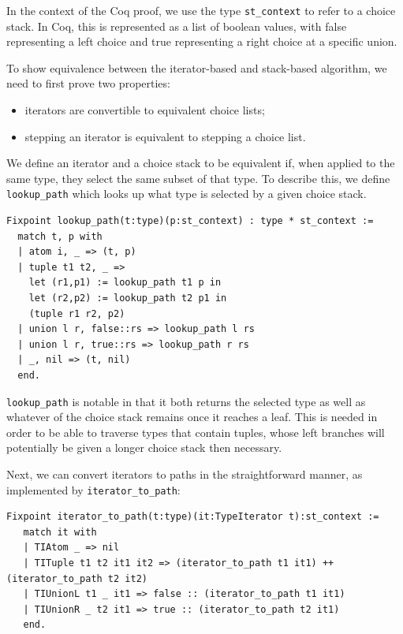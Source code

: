 \documentclass[a4paper,english]{lipics-v2019}
\begin{document}
In the context of the Coq proof, we use the type \verb|st_context| to refer
to a choice stack. In Coq, this is represented as a list of boolean values,
with false representing a left choice and true representing a right choice at
a specific union.

To show equivalence between the iterator-based and stack-based algorithm, we need to
first prove two properties:

\begin{itemize}
  \item iterators are convertible to equivalent choice lists;
  \item stepping an iterator is equivalent to stepping a choice list.
\end{itemize}

We define an iterator and a choice stack to be equivalent if, when applied to
the same type, they select the same subset of that type. To describe this, we
define \verb|lookup_path| which looks up what type is selected by a given
choice stack.

\begin{small}\begin{verbatim}
Fixpoint lookup_path(t:type)(p:st_context) : type * st_context :=
  match t, p with
  | atom i, _ => (t, p)
  | tuple t1 t2, _ =>
    let (r1,p1) := lookup_path t1 p in
    let (r2,p2) := lookup_path t2 p1 in
    (tuple r1 r2, p2)
  | union l r, false::rs => lookup_path l rs
  | union l r, true::rs => lookup_path r rs
  | _, nil => (t, nil)
  end.
\end{verbatim}\end{small}

\verb|lookup_path| is notable in that it both returns the selected type as
well as whatever of the choice stack remains once it reaches a leaf. This is
needed in order to be able to traverse types that contain tuples,  whose left
branches will potentially be given a longer choice stack then necessary.

Next, we can convert iterators to paths in the straightforward manner, as
implemented by \verb|iterator_to_path|:

\begin{small}\begin{verbatim}
Fixpoint iterator_to_path(t:type)(it:TypeIterator t):st_context :=
   match it with
   | TIAtom _ => nil
   | TITuple t1 t2 it1 it2 => (iterator_to_path t1 it1) ++ (iterator_to_path t2 it2)
   | TIUnionL t1 _ it1 => false :: (iterator_to_path t1 it1)
   | TIUnionR _ t2 it1 => true :: (iterator_to_path t2 it1)
   end.
\end{verbatim}\end{small}
\end{document}
